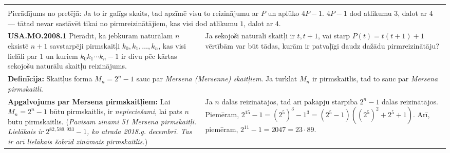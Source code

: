 \documentclass[a4paper]{article}
\begin{document}
\begin{table}[ht!]
{\begin{tabular*}{18.46cm}{@{}|p{10.35cm}|p{7.25cm}|@{}}
{} \\
\multicolumn{2}{|p{18.05cm}|}{
Pierādījums no pretējā: Ja to ir galīgs skaits, tad apzīmē visu to reizinājumu ar $P$ 
un aplūko $4P-1$. $4P-1$ dod atlikumu $3$, dalot ar $4$ --- tātad nevar sastāvēt tikai no pirmreizinātājiem, 
kas visi dod atlikumu $1$, dalot ar $4$.
} \\ \hline
\cellcolor[HTML]{E1FFE1}
{\bf USA.MO.2008.1} Pierādīt, ka jebkuram naturālam $n$ eksistē $n+1$ savstarpēji pirmskaitļi 
$k_0,k_1,\ldots,k_n$, kas visi lielāli par $1$ un kuriem $k_0k_1\cdots{}k_n-1$ ir divu pēc kārtas 
sekojošu naturālu skaitļu reizinājums. &
Ja sekojoši naturāli skaitļi ir $t, t+1$, vai starp $P(t)=t(t+1)+1$ vērtībām var būt tādas, kurām ir
patvaļīgi daudz dažādu pirmreizinātāju? \\ \hline
\multicolumn{2}{|p{18.05cm}|}{
{\bf Definīcija:} Skaitļus formā $M_n=2^n-1$ sauc par {\em Mersena (Mersenne) skaitļiem}. 
Ja turklāt $M_n$ ir pirmskaitlis, tad to sauc par {\em Mersena pirmskaitli}.
} \\ \hline
{\bf Apgalvojums par Mersena pirmskaitļiem:} Lai $M_n=2^n-1$ būtu pirmskaitlis, ir 
{\em nepieciešami}, lai pats $n$ būtu pirmskaitlis.\newline
({\em Pavisam zināmi 51 Mersena pirmskaitļi. Lielākais ir $2^{82,589,933}-1$, ko atrada 2018.g. decembrī.
Tas ir arī lielākais šobrīd zināmais pirmskaitlis.}) &
Ja $n$ dalās reizinātājos, tad arī pakāpju starpība $2^n-1$ dalās reizinātājos. 
Piemēram, $2^{15}-1 = (2^5)^3-1^3=(2^5-1)((2^5)^2+2^5+1)$. Arī, 
piemēram, $2^{11}-1=2047=23\cdot{}89$. \\ \hline
\end{tabular*}
}
\end{table}
\end{document}

